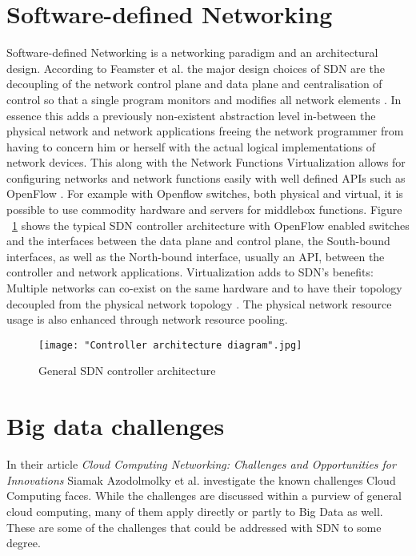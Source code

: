 \documentclass{acm_proc_article-sp}
\begin{document}
\section{Software-defined Networking}

Software-defined Networking is a networking paradigm and an architectural design. According to Feamster et al. the major design choices of SDN are the decoupling of the network control plane and data plane and centralisation of control so that a single program monitors and modifies all network elements \cite{Feamster:2013:RS:2559899.2560327}. In essence this adds a previously non-existent abstraction level in-between the physical network and network applications freeing the network programmer from having to concern him or herself with the actual logical implementations of network devices. This along with the Network Functions Virtualization allows for configuring networks and network functions easily with well defined APIs such as OpenFlow \cite{McKeown-CCR2008}. For example with Openflow switches, both physical and virtual, it is possible to use commodity hardware and servers for middlebox functions. Figure ~\ref{fig:architecture} shows the typical SDN controller architecture with OpenFlow enabled switches and the interfaces between the data plane and control plane, the South-bound interfaces, as well as the North-bound interface, usually an API, between the controller and network applications. Virtualization adds to SDN's benefits: Multiple networks can co-exist on the same hardware and to have their topology decoupled from the physical network topology \cite{Azodolmolky}. The physical network resource usage is also enhanced through network resource pooling. 

\begin{figure}[ht!]
\centering
{}
\texttt{[image: "Controller architecture diagram".jpg]}
\caption{General SDN controller architecture}
\label{fig:architecture}
\end{figure} 




\section{Big data challenges}

In their article \textit{Cloud Computing Networking: Challenges and Opportunities for Innovations} \cite{Azodolmolky} Siamak Azodolmolky et al. investigate the known challenges Cloud Computing faces. While the challenges are discussed within a purview of general cloud computing, many of them apply directly or partly to Big Data as well. These are some of the challenges that could be addressed with SDN to some degree.
\end{document}
